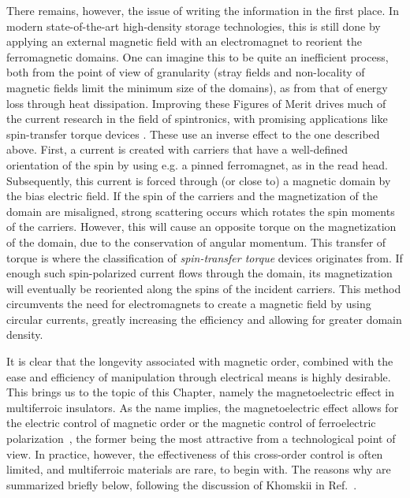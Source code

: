 There remains, however, the issue of writing the information in the first place.
In modern state-of-the-art high-density storage technologies, this is still done by applying an external magnetic field with an electromagnet to reorient the ferromagnetic domains. One can imagine this to be quite an inefficient process, both from the point of view of granularity (stray fields and non-locality of magnetic fields limit the minimum size of the domains), as from that of energy loss through heat dissipation.
Improving these Figures of Merit drives much of the current research in the field of spintronics, with promising applications like spin-transfer torque devices \cite{Nunez2006TheorySemiconductors,Nunez2006TheoryMetals,Nunez2011, Kent2015, Jungwirth2016}.
These use an inverse effect to the one described above.
First, a current is created with carriers that have a well-defined orientation of the spin by using e.g. a pinned ferromagnet, as in the read head.
Subsequently, this current is forced through (or close to) a magnetic domain by the bias electric field.
If the spin of the carriers and the magnetization of the domain are misaligned, strong scattering occurs which rotates the spin moments of the carriers.
However, this will cause an opposite torque on the magnetization of the domain, due to the conservation of angular momentum. This transfer of torque is where the classification of {\it spin-transfer torque} devices originates from.
If enough such spin-polarized current flows through the domain, its magnetization will eventually be reoriented along the spins of the incident carriers. This method circumvents the need for electromagnets to create a magnetic field by using circular currents, greatly increasing the efficiency and allowing for greater domain density.

It is clear that the longevity associated with magnetic order, combined with the ease and efficiency of manipulation through electrical means is highly desirable.
This brings us to the topic of this Chapter, namely the magnetoelectric effect in multiferroic insulators.
As the name implies, the magnetoelectric effect allows for the electric control of magnetic order or the magnetic control of ferroelectric polarization~\cite{Spaldin2019,Khomskii2009,Fiebig2005,Fiebig2016,Cheong2007}, the former being the most attractive from a technological point of view.
In practice, however, the effectiveness of this cross-order control is often limited, and multiferroic materials are rare, to begin with.
The reasons why are summarized briefly below, following the discussion of Khomskii in Ref.~\cite{Khomskii2009}.

